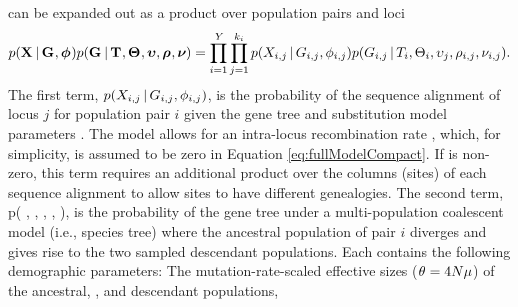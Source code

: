 \begin{linenomath}
can be expanded out as a product over population pairs and loci
\begin{equation}
    p(\alignmentVector \given \geneTreeVector, \hkyModelVector)
    p(\geneTreeVector \given \divTimeMapVector, \demographicParamVector,
    \locusMutationRateScalarVector, \ploidyScalarVector,
    \mutationRateScalarConstantVector) = 
    \prod_{i=1}^{\npairs{}}
    \prod_{j=1}^{\nloci{i}}
    p(\alignment{i}{j} \given \geneTree{i}{j}, \hkyModel{i}{j})
    p(\geneTree{i}{j} \given \divTimeMap{i}, \demographicParams{i},
    \locusMutationRateScalar{j}, \ploidyScalar{i}{j},
    \mutationRateScalarConstant{i}{j}).
    \label{eq:modelLikelihoodExpanded}
\end{equation}
The first term,
$p(\alignment{i}{j} \given \geneTree{i}{j}, \hkyModel{i}{j})$, is the
probability of the sequence alignment of locus $j$ for population pair $i$
given the gene tree and \hky \cite{HKY} substitution model parameters
\cite[i.e., the ``Felsenstein likelihood'']{Felsenstein1981}.
The model allows for an intra-locus recombination rate \recombinationRate,
which, for simplicity, is assumed to be zero in Equation
\ref{eq:fullModelCompact}.
If \recombinationRate is non-zero, this term requires an additional product
over the columns (sites) of each sequence alignment to allow sites to have
different genealogies.
The second term,
p( \given {}, ,
, ,
),
is the probability of the gene tree under a multi-population coalescent model
(i.e., species tree) where the ancestral population of pair $i$ diverges
and gives rise to the two sampled descendant populations.
Each \demographicParams{} contains the following demographic parameters: The
mutation-rate-scaled effective sizes ($\theta_{} = 4N\mu$) of the
ancestral, \ancestralTheta{}, and descendant populations, 

\end{linenomath}
